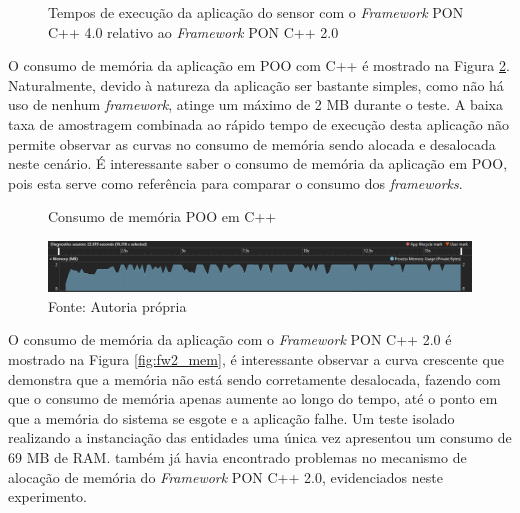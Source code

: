 \begin{figure}[!htb]
  \centering
  \caption{Tempos de execução da aplicação do sensor com o \textit{Framework} PON C++ 4.0 relativo ao \textit{Framework} PON C++ 2.0}
  \label{fig:sensor_bench2}
  \end{figure}

O consumo de memória da aplicação em POO com C++ é mostrado na Figura
\ref{fig:poo_mem}. Naturalmente, devido à natureza da aplicação ser bastante
simples, como não há uso de nenhum \textit{framework}, atinge um máximo de 2 MB
durante o teste. A baixa taxa de amostragem combinada ao rápido tempo de
execução desta aplicação não permite observar as curvas no consumo de memória
sendo alocada e desalocada neste cenário. É interessante saber o consumo de
memória da aplicação em POO, pois esta serve como referência para comparar o
consumo dos \textit{frameworks}.

\begin{figure}[!htb]
\centering
\caption{Consumo de memória POO em C++}
\includegraphics[width=\textwidth]{../figures/poo_mem.png}
\smallskip
\caption*{Fonte: Autoria própria}
\label{fig:poo_mem}
\end{figure}

O consumo de memória da aplicação com o \textit{Framework} PON C++ 2.0 é
mostrado na Figura \ref{fig:fw2_mem}, é interessante observar a curva crescente
que demonstra que a memória não está sendo corretamente desalocada, fazendo com
que o consumo de memória apenas aumente ao longo do tempo, até o ponto em que a
memória do sistema se esgote e a aplicação falhe. Um teste isolado realizando a
instanciação das entidades uma única vez apresentou um consumo de 69 MB de RAM.
 também já havia encontrado problemas no mecanismo
de alocação de memória do \textit{Framework} PON C++ 2.0, evidenciados neste
experimento.

